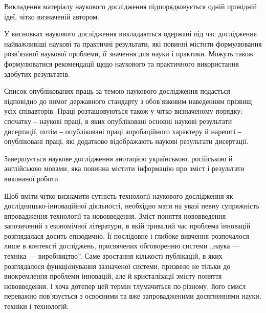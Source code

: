 Викладення матеріалу наукового дослідження підпорядковується одній
провідній ідеї, чітко визначеній автором.

У висновках наукового дослідження викладаються одержані під час
дослідження найважливіші наукові та практичні результати, які повинні
містити формулювання розв’язаної наукової проблеми, її значення для науки і
практики. Можуть також формулюватися рекомендації щодо наукового та
практичного використання здобутих результатів.

Список опублікованих праць за темою наукового дослідження подається
відповідно до вимог державного стандарту з обов’язковим наведенням прізвищ
усіх співавторів. Праці розташовуються також у чітко визначеному порядку:
спочатку ‒ наукові праці, в яких опубліковані основні наукові результати
дисертації, потім ‒ опубліковані праці апробаційного характеру й нарешті ‒
опубліковані праці, які додатково відображають наукові результати дисертації.

Завершується наукове дослідження анотацією українською, російською й
англійською мовами, яка повинна містити інформацію про зміст і результати
виконаної роботи.

Щоб вміти чітко визначити сутність технології наукового дослідження як
дослід\-ницько-інноваційної діяльності, необхідно мати на увазі певну
супряжність впровадження технології та нововведення. Зміст поняття
нововведення запозичений з економічної літератури, в якій тривалий час
проблема інновацій розглядалася досить епізодично. Її послідовне і глибоке
вивчення розпочалося лише в контексті досліджень, присвячених обговоренню
системи „наука --- техніка --- виробництво”. Саме зростання кількості публікацій,
в яких розглядалося функціонування зазначеної системи, призвело не тільки до
виокремлення проблеми інновацій, але й кристалізації змісту поняття
нововведення. І хоча дотепер цей термін тлумачиться по-різному, його смисл
переважно пов’язується з освоєними та вже запровадженими досягненнями
науки, техніки і технологій.

